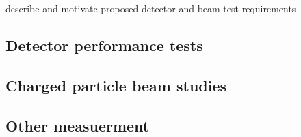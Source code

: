 describe and motivate proposed detector and beam test requirements 

\subsection{Detector performance tests}

\subsection{Charged particle beam studies}
\subsection{Other measuerment}

